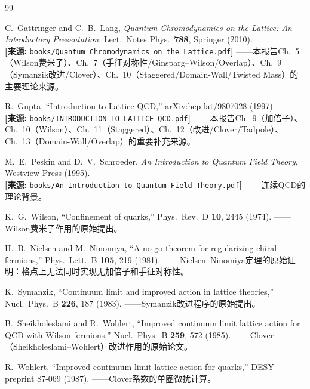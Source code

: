 \documentclass[12pt,a4paper]{ctexart}
\theoremstyle{definition}
\begin{document}
\begin{thebibliography}{99}

C.~Gattringer and C.~B.~Lang,
\textit{Quantum Chromodynamics on the Lattice: An Introductory Presentation},
Lect.\ Notes Phys.\ \textbf{788}, Springer (2010).
\\\textbf{[来源:} \texttt{books/Quantum Chromodynamics on the Lattice.pdf}\textbf{]}
——本报告Ch.~5（Wilson费米子）、Ch.~7（手征对称性/Ginsparg--Wilson/Overlap）、Ch.~9（Symanzik改进/Clover）、Ch.~10（Staggered/Domain-Wall/Twisted Mass）的主要理论来源。

R.~Gupta,
``Introduction to Lattice QCD,''
arXiv:hep-lat/9807028 (1997).
\\\textbf{[来源:} \texttt{books/INTRODUCTION TO LATTICE QCD.pdf}\textbf{]}
——本报告Ch.~9（加倍子）、Ch.~10（Wilson）、Ch.~11（Staggered）、Ch.~12（改进/Clover/Tadpole）、Ch.~13（Domain-Wall/Overlap）的重要补充来源。

M.~E.~Peskin and D.~V.~Schroeder,
\textit{An Introduction to Quantum Field Theory},
Westview Press (1995).
\\\textbf{[来源:} \texttt{books/An Introduction to Quantum Field Theory.pdf}\textbf{]}
——连续QCD的理论背景。

K.~G.~Wilson,
``Confinement of quarks,''
Phys.\ Rev.\ D \textbf{10}, 2445 (1974).
——Wilson费米子作用的原始提出。

H.~B.~Nielsen and M.~Ninomiya,
``A no-go theorem for regularizing chiral fermions,''
Phys.\ Lett.\ B \textbf{105}, 219 (1981).
——Nielsen--Ninomiya定理的原始证明：格点上无法同时实现无加倍子和手征对称性。

K.~Symanzik,
``Continuum limit and improved action in lattice theories,''
Nucl.\ Phys.\ B \textbf{226}, 187 (1983).
——Symanzik改进程序的原始提出。

B.~Sheikholeslami and R.~Wohlert,
``Improved continuum limit lattice action for QCD with Wilson fermions,''
Nucl.\ Phys.\ B \textbf{259}, 572 (1985).
——Clover（Sheikholeslami--Wohlert）改进作用的原始论文。

R.~Wohlert,
``Improved continuum limit lattice action for quarks,''
DESY preprint 87-069 (1987).
——Clover系数的单圈微扰计算。


\end{thebibliography}
\end{document}
